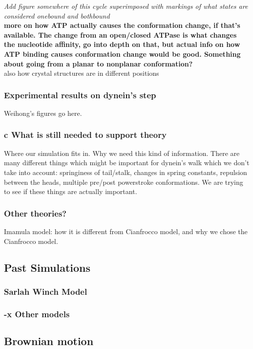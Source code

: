 \documentclass[10pt]{article} %
\begin{document}
\textit{Add figure somewhere of this cycle superimposed with markings of what states are considered onebound and bothbound}\\

\textbf{more on how ATP actually causes the conformation change, if that's available. The change from an open/closed ATPase is what changes the nucleotide affinity, go into depth on that, but actual info on how ATP binding causes conformation change would be good. Something about going from a planar to nonplanar conformation?}\\

also how crystal structures are in different positions

\subsubsection{Experimental results on dynein’s step}
Weihong's figures go here.\\

\subsubsection{c What is still needed to support theory}
Where our simulation fits in. Why we need this kind of information.
There are many different things which might be important for dynein's walk which we don't take into account: springiness of tail/stalk, changes in spring constants, repulsion between the heads, multiple pre/post powerstroke conformations. We are trying to see if these things are actually important.

\subsubsection{Other theories?}
Imamula model: how it is different from Cianfrocco model, and why we chose the Cianfrocco model.\\
	\subsection{Past Simulations}
		\subsubsection{Sarlah Winch Model}
		\subsubsection{-x Other models}
	\subsection{Brownian motion}
\end{document}
